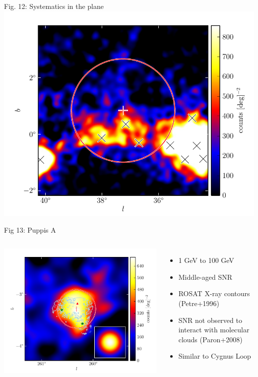 \documentclass[12pt]{beamer}
\begin{document}
\begin{frame}{Fig. 12: Systematics in the plane}
  \includegraphics[scale=0.5]{plots/example_bad_fit_color.pdf}
\end{frame}

\begin{frame}{Fig 13: Puppis A}

  \begin{columns}
    \includegraphics[scale=0.50]{plots/source_Puppis_A_color.pdf}

    \begin{itemize}
    \item 1 GeV to 100 GeV
      \item Middle-aged SNR
      \item ROSAT X-ray contours (Petre+1996)
      \item SNR not observed to interact with
      molecular clouds (Paron+2008)
      \item Similar to Cygnus Loop
      \end{itemize}
  \end{columns}
\end{frame}
\end{document}

